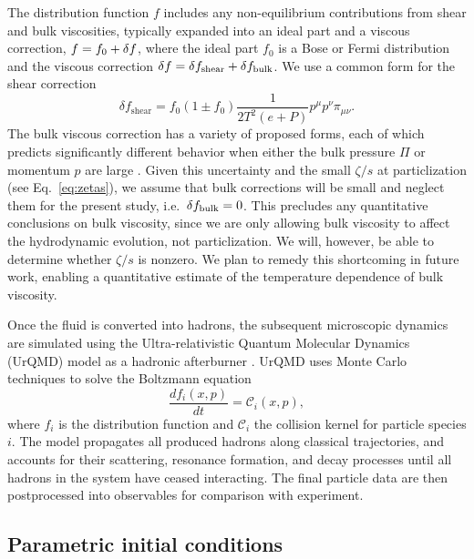 \documentclass[aps,prc,reprint,amsmath,nofootinbib,noeprint]{revtex4-1}
\begin{document}
The distribution function $f$ includes any non-equilibrium contributions from shear and bulk viscosities, typically expanded into an ideal part and a viscous correction, $f = f_0 + \delta f$, where the ideal part $f_0$ is a Bose or Fermi distribution and the viscous correction $\delta f = \delta f_\text{shear} + \delta f_\text{bulk}$.
We use a common form for the shear correction \cite{Teaney:2003kp}
\begin{equation}
  \delta f_\text{shear} = f_0(1 \pm f_0) \frac{1}{2T^2(e+P)} p^\mu p^\nu \pi_{\mu\nu}.
\end{equation}
The bulk viscous correction has a variety of proposed forms, each of which predicts significantly different behavior when either the bulk pressure $\Pi$ or momentum $p$ are large \cite{Dusling:2011fd, Noronha-Hostler:2013gga}.
Given this uncertainty and the small $\zeta/s$ at particlization (see Eq.~\eqref{eq:zetas}), we assume that bulk corrections will be small and neglect them for the present study, i.e.\ $\delta f_\text{bulk} = 0$.
This precludes any quantitative conclusions on bulk viscosity, since we are only allowing bulk viscosity to affect the hydrodynamic evolution, not particlization.
We will, however, be able to determine whether $\zeta/s$ is nonzero.
We plan to remedy this shortcoming in future work, enabling a quantitative estimate of the temperature dependence of bulk viscosity.

Once the fluid is converted into hadrons, the subsequent microscopic dynamics are simulated using the Ultra-relativistic Quantum Molecular Dynamics (UrQMD) model as a hadronic afterburner \cite{Bass:1998ca, Bleicher:1999xi}.
UrQMD uses Monte Carlo techniques to solve the Boltzmann equation
\begin{equation}
  \frac{df_i(x,p)}{dt} = \mathcal{C}_i(x, p),
\end{equation}
where $f_i$ is the distribution function and $\mathcal{C}_i$ the collision kernel for particle species $i$.
The model propagates all produced hadrons along classical trajectories, and accounts for their scattering, resonance formation, and decay processes until all hadrons in the system have ceased interacting.
The final particle data are then postprocessed into observables for comparison with experiment.

\subsection{Parametric initial conditions}
\end{document}
